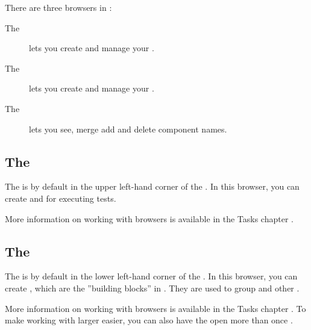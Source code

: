 
There are three browsers in \app{}:
\begin{description}
\item[The \gdtestcasebrowser{}]{ lets you create and manage your \gdcases{}. }
\item[The \gdtestsuitebrowser{}]{ lets you create and manage your \gdsuites{}.}
\item [The \gdcompnamebrowser{}]{lets you see, merge add and delete component names.}
\end{description}

\subsection{The \gdtestsuitebrowser{}}
The \gdtestsuitebrowser{} is by default in the upper left-hand corner of the \specpersp{}. In this browser, you can create \gdsuites{} and \gdjobs{} for executing tests. 

More information on working with browsers is available in the Tasks chapter .


\subsection{The \gdtestcasebrowser{}}

The \gdtestcasebrowser{} is by default in the lower left-hand corner of the \specpersp{}. In this browser, you can create \gdcases{}, which are the ''building blocks'' in \app{}. They are used to group \gdsteps{} and other \gdcases{}.  

More information on working with browsers is available in the Tasks chapter . To make working with larger \gdprojects{} easier, you can also have the \gdtestcasebrowser{} open more than once .

